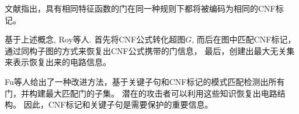 文献\cite{csRoy}指出，具有相同特征函数的门在同一种规则下都将被编码为相同的CNF标记。
%
%
%

基于上述概念,
Roy等人.\cite{csRoy}
首先将CNF公式转化超图$G$,
而后在图中匹配CNF标记，通过同构子图的方式来恢复出CNF公式携带的门信息，
最后，创建出最大无关集来表示恢复出来的电路信息。

Fu等人\cite{csFu}给出了一种改进方法，基于关键子句和CNF标记的模式匹配检测出所有门，并构建最大匹配门的子集。
%
%
潜在的攻击者可以利用这些知识恢复出电路结构。
因此，CNF标记和关键子句是需要保护的重要信息。


